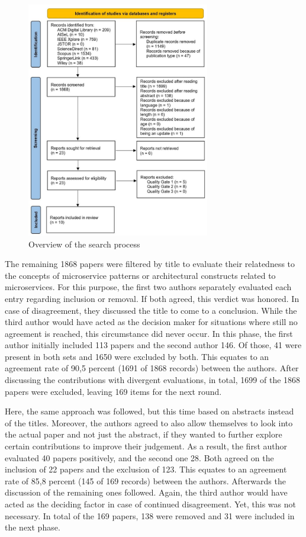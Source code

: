 \documentclass[conference]{IEEEtran}
\begin{document}
\begin{figure}[h]
    \centering 
    \includegraphics[width=8cm]{../Media/PRISMA-Flowchart.JPG}
    \caption{Overview of the search process}
    \label{fig:PRISMA}
\end{figure}

The remaining 1868 papers were filtered by title to evaluate their relatedness to the concepts of microservice patterns or architectural constructs related to microservices. For this purpose, the first two authors separately evaluated each entry regarding inclusion or removal. If both agreed, this verdict was honored. In case of disagreement, they discussed the title to come to a conclusion. While the third author would have acted as the decision maker for situations where still no agreement is reached, this circumstance did never occur. In this phase, the first author initially included 113 papers and the second author 146. Of those, 41 were present in both sets and 1650 were excluded by both. This equates to an agreement rate of 90,5 percent (1691 of 1868 records) between the authors. After discussing the contributions with divergent evaluations, in total, 1699 of the 1868 papers were excluded, leaving 169 items for the next round.


Here, the same approach was followed, but this time based on abstracts instead of the titles. Moreover, the authors agreed to also allow themselves to look into the actual paper and not just the abstract, if they wanted to further explore certain contributions to improve their judgement. As a result, the first author evaluated 40 papers positively, and the second one 28. Both agreed on the inclusion of 22 papers and the exclusion of 123. This equates to an agreement rate of 85,8 percent (145 of 169 records) between the authors. Afterwards the discussion of the remaining ones followed. Again, the third author would have acted as the deciding factor in case of continued disagreement. Yet, this was not necessary. In total of the 169 papers, 138 were removed and 31 were included in the next phase.
\end{document}
